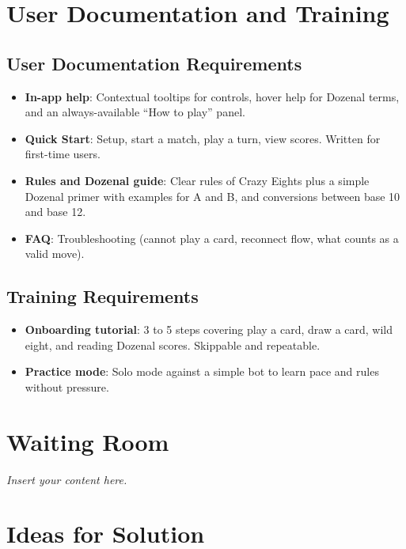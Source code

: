 \documentclass[12pt]{article}
\newcommand{\lips}{\textit{Insert your content here.}}
\begin{document}
\section{User Documentation and Training}

\subsection{User Documentation Requirements}
\begin{itemize}
  \item \textbf{In-app help}: Contextual tooltips for controls, hover help for Dozenal terms, and an always-available ``How to play'' panel.
  \item \textbf{Quick Start}: Setup, start a match, play a turn, view scores. Written for first-time users.
  \item \textbf{Rules and Dozenal guide}: Clear rules of Crazy Eights plus a simple Dozenal primer with examples for A and B, and conversions between base 10 and base 12.
  \item \textbf{FAQ}: Troubleshooting (cannot play a card, reconnect flow, what counts as a valid move).
\end{itemize}

\subsection{Training Requirements}
\begin{itemize}
  \item \textbf{Onboarding tutorial}: 3 to 5 steps covering play a card, draw a card, wild eight, and reading Dozenal scores. Skippable and repeatable.
  \item \textbf{Practice mode}: Solo mode against a simple bot to learn pace and rules without pressure.
\end{itemize}

\section{Waiting Room}
\lips

\section{Ideas for Solution}
\end{document}

